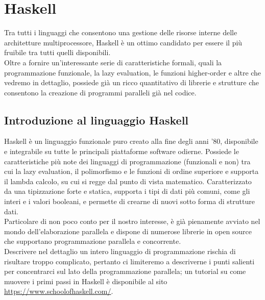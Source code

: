 


\section{Haskell}
Tra tutti i linguaggi che consentono una gestione delle risorse interne delle architetture multiprocessore, Haskell è un ottimo candidato per essere il più fruibile tra tutti quelli disponibili.\\
Oltre a fornire un'interessante serie di caratteristiche formali, quali la programmazione funzionale, la lazy evaluation, le funzioni higher-order e altre che vedremo in dettaglio, possiede già un ricco quantitativo di librerie e strutture che consentono la creazione di programmi paralleli già nel codice.
\subsection{Introduzione al linguaggio Haskell}
Haskell è un linguaggio funzionale puro creato alla fine degli anni '80, disponibile e integrabile su tutte le principali piattaforme software odierne. Possiede le caratteristiche più note dei linguaggi di programmazione (funzionali e non) tra cui la lazy evaluation, il polimorfismo e le funzioni di ordine superiore e supporta il lambda calcolo, su cui si regge dal punto di vista matematico. Caratterizzato da una tipizzazione forte e statica, supporta i tipi di dati più comuni, come gli interi e i valori booleani, e permette di crearne di nuovi sotto forma di strutture dati.\\
Particolare di non poco conto per il nostro interesse, è già pienamente avviato nel mondo dell'elaborazione parallela e dispone di numerose librerie in open source che supportano programmazione parallela e concorrente.\\
Descrivere nel dettaglio un intero linguaggio di programmazione rischia di risultare troppo complicato, pertanto ci limiteremo a descriverne i punti salienti per concentrarci sul lato della programmazione parallela; un tutorial su come muovere i primi passi in Haskell è disponibile al sito \url{https://www.schoolofhaskell.com/}.
